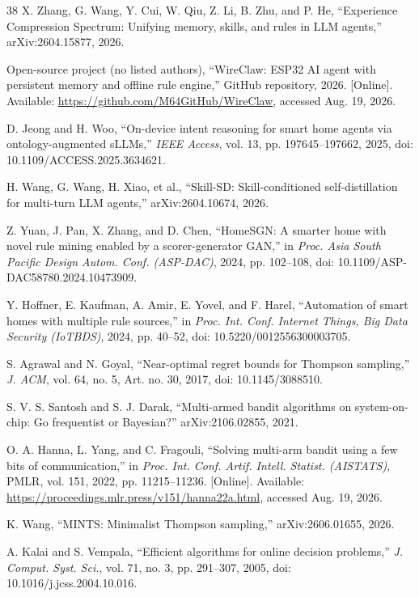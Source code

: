 \documentclass[review]{elsarticle}
\begin{document}
\begin{thebibliography}{38}
 X. Zhang, G. Wang, Y. Cui, W. Qiu, Z. Li, B. Zhu, and P. He,
``Experience Compression Spectrum: Unifying memory, skills, and rules in LLM
agents,'' arXiv:2604.15877, 2026.

 Open-source project (no listed authors), ``WireClaw: ESP32 AI
agent with persistent memory and offline rule engine,'' GitHub repository,
2026. [Online]. Available:
\url{https://github.com/M64GitHub/WireClaw}, accessed Aug. 19, 2026.

 D. Jeong and H. Woo, ``On-device intent reasoning for smart home
agents via ontology-augmented sLLMs,'' \emph{IEEE Access}, vol. 13, pp.
197645--197662, 2025, doi: 10.1109/ACCESS.2025.3634621.

 H. Wang, G. Wang, H. Xiao, et al., ``Skill-SD:
Skill-conditioned self-distillation for multi-turn LLM agents,''
arXiv:2604.10674, 2026.

 Z. Yuan, J. Pan, X. Zhang, and D. Chen, ``HomeSGN: A smarter
home with novel rule mining enabled by a scorer-generator GAN,'' in
\emph{Proc. Asia South Pacific Design Autom. Conf. (ASP-DAC)}, 2024, pp.
102--108, doi: 10.1109/ASP-DAC58780.2024.10473909.

 Y. Hoffner, E. Kaufman, A. Amir, E. Yovel, and F. Harel,
``Automation of smart homes with multiple rule sources,'' in \emph{Proc. Int.
Conf. Internet Things, Big Data Security (IoTBDS)}, 2024, pp. 40--52, doi:
10.5220/0012556300003705.

 S. Agrawal and N. Goyal, ``Near-optimal regret bounds for
Thompson sampling,'' \emph{J. ACM}, vol. 64, no. 5, Art. no. 30, 2017, doi:
10.1145/3088510.

 S. V. S. Santosh and S. J. Darak, ``Multi-armed bandit
algorithms on system-on-chip: Go frequentist or Bayesian?''
arXiv:2106.02855, 2021.

 O. A. Hanna, L. Yang, and C. Fragouli, ``Solving multi-arm
bandit using a few bits of communication,'' in \emph{Proc. Int. Conf. Artif.
Intell. Statist. (AISTATS)}, PMLR, vol. 151, 2022, pp. 11215--11236.
[Online]. Available:
\url{https://proceedings.mlr.press/v151/hanna22a.html}, accessed Aug. 19,
2026.

 K. Wang, ``MINTS: Minimalist Thompson sampling,'' arXiv:2606.01655,
2026.

 A. Kalai and S. Vempala, ``Efficient algorithms for online
decision problems,'' \emph{J. Comput. Syst. Sci.}, vol. 71, no. 3, pp.
291--307, 2005, doi: 10.1016/j.jcss.2004.10.016.


\end{thebibliography}
\end{document}
